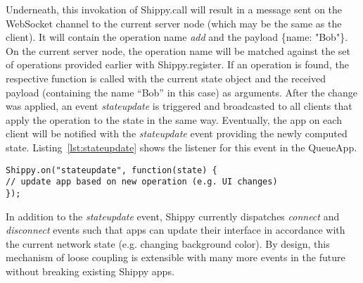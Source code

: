 Underneath, this invokation of {\ttfamily Shippy.call} will result in a message sent on the WebSocket channel to the current server node (which may be the same as the client).
It will contain the operation name \textit{add} and the payload {\ttfamily \{name: "Bob"\}}.
On the current server node, the operation name will be matched against the set of operations provided earlier with {\ttfamily Shippy.register}.
If an operation is found, the respective function is called with the current state object and the received payload (containing the name ``Bob'' in this case) as arguments.
After the change was applied, an event \textit{stateupdate} is triggered and broadcasted to all clients that apply the operation to the state in the same way.
Eventually, the app on each client will be notified with the \textit{stateupdate} event providing the newly computed state.
Listing~\ref{lst:stateupdate} shows the listener for this event in the QueueApp.

\begin{lstlisting}[caption={stateupdate listener},label={lst:stateupdate}]
Shippy.on("stateupdate", function(state) {
// update app based on new operation (e.g. UI changes)
});
\end{lstlisting}

In addition to the \textit{stateupdate} event, Shippy currently dispatches \textit{connect} and \textit{disconnect} events such that apps can update their interface in accordance with the current network state (e.g. changing background color).
By design, this mechanism of loose coupling is extensible with many more events in the future without breaking existing Shippy apps.